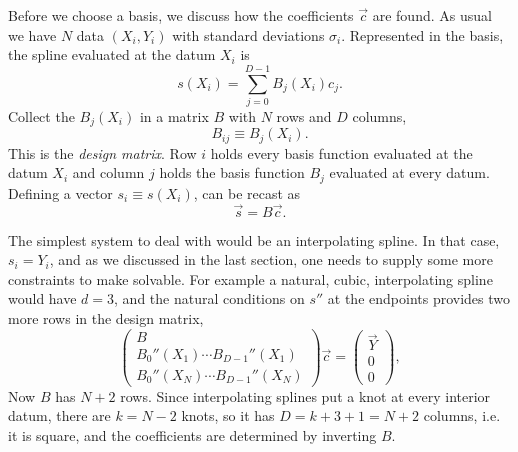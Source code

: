 Before we choose a basis, we discuss how the coefficients $\vec{c}$ are found.
As usual we have $N$ data $(X_i,Y_i)$ with standard deviations $\sigma_i$.
Represented in the basis, the spline evaluated at the datum $X_i$ is
\begin{equation}\label{eq:sXi}
  s(X_i)=\sum_{j=0}^{D-1} B_j(X_i)c_j .
\end{equation}
Collect the $B_j(X_i)$ in a
matrix $B$ with $N$ rows and $D$ columns,
\begin{equation}
  B_{ij}\equiv B_j(X_i).
\end{equation}
This is the {\it design matrix}. 
Row $i$ holds every basis function evaluated at
the datum $X_i$ and column $j$ holds the basis function $B_j$ evaluated at every
datum. 
Defining a vector $s_i\equiv s(X_i)$,  can be recast as 
\begin{equation}\label{eq:Bc}
  \vec{s} = B\vec{c}.
\end{equation}

The simplest system to deal with would be an interpolating spline.
In that case, $s_i=Y_i$, and as we discussed in the last section, one needs to
supply some more constraints to make  solvable. For example a
natural, cubic, interpolating spline would have $d=3$, and the natural
conditions on $s''$ at the endpoints provides two more rows in the design
matrix,
  \begin{equation}\label{eq:interp}
    \begin{pmatrix}
      B\\
      B_0''(X_1)\cdots B_{D-1}''(X_1)\\
      B_0''(X_N)\cdots B_{D-1}''(X_N)
    \end{pmatrix}\vec{c}
    =
    \begin{pmatrix}
      \vec{Y}\\ 0\\ 0
    \end{pmatrix},
  \end{equation}
Now $B$ has $N+2$ rows. Since interpolating splines put a knot at every
interior datum, there are $k=N-2$ knots, so it has $D=k+3+1=N+2$ columns, 
i.e. it is square, and the coefficients are determined by inverting $B$.

